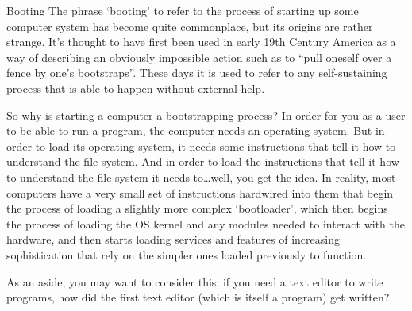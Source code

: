 \begin{diversion}{Booting}
\label{bootbox}
The phrase `booting' to refer to the process of starting up some computer system has become quite commonplace, but its origins are rather strange. It's thought to have first been used in early 19th Century America as a way of describing an obviously impossible action such as to ``pull oneself over a fence by one's bootstraps''. These days it is used to refer to any self-sustaining process that is able to happen without external help.

So why is starting a computer a bootstrapping process? In order for you as a user to be able to run a program, the computer needs an operating system. But in order to load its operating system, it needs some instructions that tell it how to understand the file system. And in order to load the instructions that tell it how to understand the file system it needs to\ldots well, you get the idea. In reality, most computers have a very small set of instructions hardwired into them that begin the process of loading a  slightly more complex `bootloader', which then begins the process of loading the OS kernel and any modules needed to interact with the hardware, and then starts loading services and features of increasing sophistication that rely on the simpler ones loaded previously to function.

As an aside, you may want to consider this: if you need a text editor to write programs, how did the first text editor (which is itself a program) get written?
\end{diversion}



